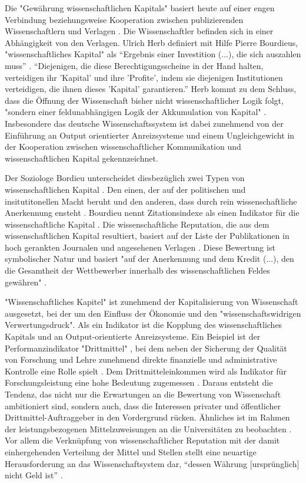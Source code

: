 Die "Gewährung wissenschaftlichen Kapitals" basiert heute auf einer engen Verbindung beziehungsweise Kooperation zwischen publizierenden Wissenschaftlern und Verlagen \cite{herb_2006}. Die Wissenschaftler befinden sich in einer Abhängigkeit von den Verlagen. Ulrich Herb definiert mit Hilfe Pierre Bourdieus, "wissenschaftliches Kapital" als “Ergebnis einer Investition (...), die sich auszahlen muss” \cite{herb_2006}. “Diejenigen, die diese Berechtigungsscheine in der Hand halten, verteidigen ihr 'Kapital' und ihre 'Profite', indem sie diejenigen Institutionen verteidigen, die ihnen dieses 'Kapital' garantieren.” \cite{Bourdieu_1992} Herb kommt zu dem Schluss, dass die Öffnung der Wissenschaft bisher nicht wissenschaftlicher Logik folgt, "sondern einer feldunabhängigen Logik der Akkumulation von Kapital" \cite{herb_2006}. Insbesondere das deutsche Wissenschaftssystem ist dabei zunehmend von der Einführung an Output orientierter Anreizsysteme \cite{osterloh2008anreize} und einem Ungleichgewicht in der Kooperation zwischen wissenschaftlicher Kommunikation und wissenschaftlichen Kapital gekennzeichnet.

Der Soziologe Bordieu unterscheidet diesbezüglich zwei Typen von wissenschaftlichen Kapital \cite{Bourdieu_1998}. Den einen, der auf der politischen und insitutitonellen Macht beruht und den anderen, dass durch rein wissenschaftliche Anerkennung ensteht \cite{mikl_2010_soziologie}. Bourdieu nennt Zitationsindexe als einen Indikator für die wissenschaftliche Kapital \cite{Bourdieu_1998}. Die wissenschaftliche Reputation, die aus dem wissenschaftlichen Kapital resultiert, basiert auf der Liste der Publikationen in hoch gerankten Journalen und angesehenen Verlagen \cite{herb_2010}. Diese Bewertung ist symbolischer Natur und basiert "auf der Anerkennung und dem Kredit (...), den die Gesamtheit der Wettbewerber innerhalb des wissenschaftlichen Feldes gewähren" \cite{Bourdieu_1998} \cite{herb_2010}.

"Wissenschaftliches Kapitel" ist zunehmend der Kapitalisierung von Wissenschaft ausgesetzt, bei der um den Einfluss der Ökonomie und den "wissenschaftswidrigen Verwertungsdruck". \cite{suchen_Hornbostel_2006} Als ein Indikator ist die Kopplung des wissenschaftliches Kapitals und an Output-orientierte Anreizsysteme. Ein Beispiel ist der Performanzindikator "Drittmittel" \cite{Jansen_2007}, bei dem neben der Sicherung der Qualität von Forschung und Lehre zunehmend direkte finanzielle und administrative Kontrolle eine Rolle spielt \cite{Barl_sius_2008}. Dem Drittmitteleinkommen wird als Indikator für Forschungsleistung eine hohe Bedeutung zugemessen \cite{Jansen_2007}. Daraus entsteht die Tendenz, das nicht nur die Erwartungen an die Bewertung von Wissenschaft ambitioniert sind, sondern auch, dass die Interessen privater und öffentlicher Drittmittel-Auftraggeber in den Vordergrund rücken. Ähnliches ist im Rahmen der leistungsbezogenen Mittelzuweisungen an die Universitäten zu beobachten \cite{suchen_Hornbostel_2006}. Vor allem die Verknüpfung von wissenschaftlicher Reputation mit der damit einhergehenden Verteilung der Mittel und Stellen stellt eine neuartige Herausforderung an das Wissenschaftsystem dar, “dessen Währung [ursprünglich] nicht Geld ist” \cite{hanekop_2006} \cite{suchen_Hornbostel_2006}.

